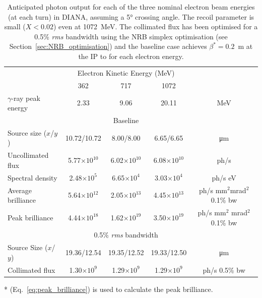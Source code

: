 \documentclass[../main.tex]{subfiles}
\begin{document}
\begin{table}[!h]
\caption{Anticipated photon output for each of the three nominal electron beam energies (at each turn) in DIANA, assuming a 5\si{\degree} crossing angle. The recoil parameter is small ($X < 0.02$) even at 1072~\si{\mega\electronvolt}. The collimated flux has been optimised for a 0.5\% \textit{rms} bandwidth using the NRB simplex optimisation (see Section~\ref{sec:NRB_optimisation}) and the baseline case achieves  $\beta^{*} =0.2$~\si{\meter} at the IP to for each electron energy.}
\vspace{3mm}
\centering
\begin{threeparttable}
\begin{tabular}{lcccc}
\hline\hline
 & \multicolumn{3}{c}{Electron Kinetic Energy (\si{\mega\electronvolt})} & \\
 \cline{2-4}
 & 362 & 717 & 1072 & \\
\hline
$\gamma$-ray peak energy  & 2.33 & 9.06 & 20.11 & \si{\mega\electronvolt}\\
\hline
 & \multicolumn{3}{c}{Baseline} & \\
\hline
Source size ($x$/$y$)  & 10.72/10.72 & 8.00/8.00 & 6.65/6.65 & \si{\micro\meter} \\
Uncollimated flux  & 5.77$\times 10^{10}$ & 6.02$\times 10^{10}$ & 6.08$\times 10^{10}$ & ph/\si{\second}\\
Spectral density  & 2.48$\times 10^{5}$ & 6.65$\times 10^{4}$ & 3.03$\times 10^{4}$ & ph/\si{\second} \si{\electronvolt}\\
Average brilliance  & 5.64$\times 10^{12}$ & 2.05$\times 10^{13}$ & 4.45$\times 10^{13}$ & ph/\si{\second} \si{\milli\meter}$^{2}$\si{\milli\radian}$^{2}$ 0.1\% bw\\
Peak brilliance\tnote{*}  & 4.44$\times 10^{18}$ & 1.62$\times 10^{19}$ & 3.50$\times 10^{19}$ & ph/\si{\second} \si{\milli\meter}$^{2}$ \si{\milli\radian}$^{2}$ 0.1\% bw\\
\hline
 & \multicolumn{3}{c}{0.5\% \textit{rms} bandwidth} & \\
\hline
Source Size ($x$/$y$) & 19.36/12.54 & 19.35/12.52 & 19.33/12.50 & \si{\micro\meter} \\ 
Collimated flux  & 1.30$\times 10^{9}$ & 1.29$\times 10^{9}$ & 1.29$\times 10^{9}$ & ph/\si{\second} 0.5\% bw \\
\hline\hline
\end{tabular}
\begin{tablenotes}
\item[*]{(Eq.~\ref{eq:peak_brilliance}) is used to calculate the peak brilliance.}
\end{tablenotes}
\end{threeparttable}
\label{tab:DIANA_spectral_output}
\end{table}
\end{document}
